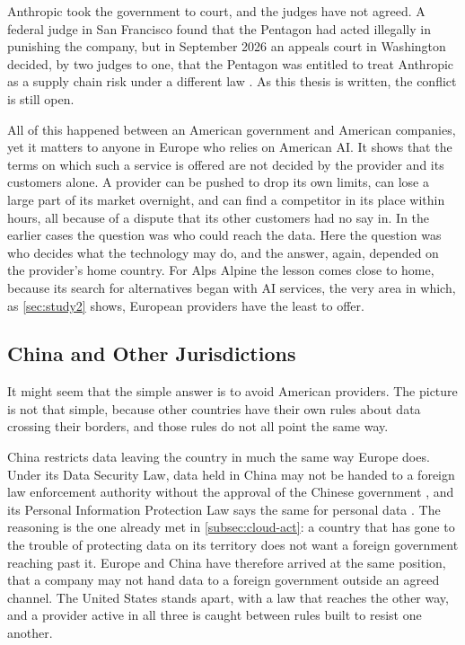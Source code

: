 Anthropic took the government to court, and the judges have not agreed. A federal
judge in San Francisco found that the Pentagon had acted illegally in punishing the
company, but in September 2026 an appeals court in Washington decided, by two
judges to one, that the Pentagon was entitled to treat Anthropic as a supply chain
risk under a different law \cite{AP_Anthropic_DCCircuit_2026}. As this thesis is
written, the conflict is still open.

All of this happened between an American government and American companies, yet it
matters to anyone in Europe who relies on American \acs{AI}. It shows that the
terms on which such a service is offered are not decided by the provider and its
customers alone. A provider can be pushed to drop its own limits, can lose a large
part of its market overnight, and can find a competitor in its place within hours,
all because of a dispute that its other customers had no say in. In the earlier
cases the question was who could reach the data. Here the question was who decides
what the technology may do, and the answer, again, depended on the provider's home
country. For Alps Alpine the lesson comes close to home, because its search for
alternatives began with \acs{AI} services, the very area in which, as
\cref{sec:study2} shows, European providers have the least to offer.

\subsection{China and Other Jurisdictions}
\label{subsec:other-jurisdictions}

It might seem that the simple answer is to avoid American providers. The picture is
not that simple, because other countries have their own rules about data crossing
their borders, and those rules do not all point the same way.

China restricts data leaving the country in much the same way Europe does. Under
its Data Security Law, data held in China may not be handed to a foreign law
enforcement authority without the approval of the Chinese government
\cite{ChinaDSL_2021}, and its Personal Information Protection Law says the same for
personal data \cite{ChinaPIPL_2021}. The reasoning is the one already met in
\cref{subsec:cloud-act}: a country that has gone to the trouble of protecting data
on its territory does not want a foreign government reaching past it. Europe and
China have therefore arrived at the same position, that a company may not hand data
to a foreign government outside an agreed channel. The United States stands apart,
with a law that reaches the other way, and a provider active in all three is caught
between rules built to resist one another.

